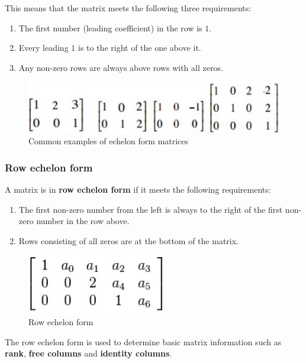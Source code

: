 \documentclass[10pt,a4paper]{article}
\begin{document}
This means that the matrix meets the following three requirements:
\begin{enumerate}
    \item The first number (leading coefficient) in the row is $1$.
    \item Every leading $1$ is to the right of the one above it.
    \item Any non-zero rows are always above rows with all zeros.
\end{enumerate}
\begin{figure} [h!]
    \centering
    \includegraphics[scale=0.7]{Common echelon.JPG}
    \caption{Common examples of echelon form matrices}
\end{figure}

\subsubsection{Row echelon form}

A matrix is in \textbf{row echelon form} if it meets the following requirements:
\begin{enumerate}
    \item The first non-zero number from the left is always to the right of the first non-zero number in the row above.
    \item Rows consisting of all zeros are at the bottom of the matrix.
\end{enumerate}
\begin{figure} [h!]
    \centering
    \includegraphics[scale=0.7]{row echelon form}
    \caption{Row echelon form}
\end{figure}

The row echelon form is used to determine basic matrix information such as \textbf{rank},
\textbf{free columns} and \textbf{identity columns}.
\end{document}
